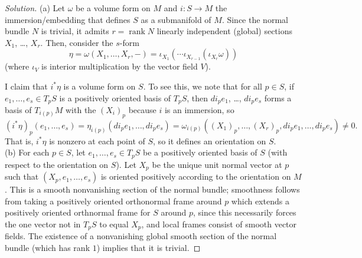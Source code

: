 \documentclass[10pt]{article}
\newenvironment{soln}{\begin{proof}[Solution]}{\end{proof}}
\begin{document}
\begin{soln}
    (a) Let $\omega$ be a volume form on $M$ and $i\colon S\to M$
    the immersion/embedding that defines $S$ as a submanifold of $M$.
    Since the normal bundle $N$ is trivial,
    it admits $r = \operatorname{rank} N$ linearly independent
    (global) sections $X_1$, \dots, $X_r$.
    Then, consider the $s$-form
    \[
	\eta = \omega(X_1,\dots,X_r, -)
	= \iota_{X_1}(\cdots \iota_{X_{r-1}}(\iota_{X_r}\omega))
    \]
    (where $\iota_V$ is interior multiplication by the vector field $V$).

    I claim that $i^*\eta$ is a volume form on $S$.
    To see this, we note that for all $p\in S$,
    if $e_1,\dots,e_s\in T_pS$ is a positively oriented basis of $T_pS$,
    then $di_pe_1$, \dots, $di_pe_s$ forms a basis
    of $T_{i(p)}M$ with the $(X_i)_p$
    because $i$ is an immersion, so
    \begin{equation*}
	(i^*\eta)_p(e_1,\dots,e_s)
	= \eta_{i(p)}(di_pe_1,\dots,di_pe_s)
	= \omega_{i(p)}((X_1)_p,\dots,(X_r)_p,
	di_pe_1,\dots,di_pe_s)\ne 0.
    \end{equation*}
    That is, $i^*\eta$ is nonzero
    at each point of $S$, so it defines an orientation on $S$.
    \\

    (b) For each $p\in S$, let $e_1,\dots,e_s\in T_pS$
    be a positively oriented basis of $S$
    (with respect to the orientation on $S$).
    Let $X_p$ be the unique unit normal vector at $p$
    such that $(X_p,e_1,\dots,e_s)$ is oriented positively
    according to the orientation on $M$.
    This is a smooth nonvanishing section of the normal bundle;
    smoothness follows from taking
    a positively oriented orthonormal frame around $p$
    which extends a positively oriented orthnormal frame for $S$ around $p$,
    since this necessarily forces the one vector
    not in $T_pS$ to equal $X_p$, and local frames
    consist of smooth vector fields.
    The existence of a nonvanishing global smooth section
    of the normal bundle (which has rank $1$) implies that it is trivial.
\end{soln}
\end{document}
